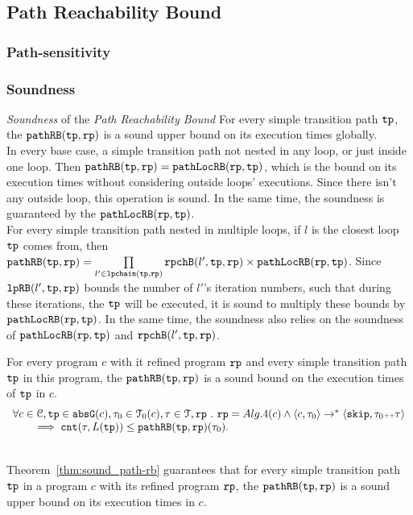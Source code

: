 \subsection{Path Reachability Bound}
\subsubsection{Path-sensitivity}
\subsubsection{Soundness}


\emph{Soundness} of the \emph{Path Reachability Bound}  
For every simple transition path $\mathtt{tp}$, the $\mathtt{pathRB}(\mathtt{tp}, \mathtt{rp})$
is a sound upper bound on its execution times globally.
\\
In every base case, a simple transition path not nested in any loop, or just inside one loop.
Then $\mathtt{pathRB}(\mathtt{tp}, \mathtt{rp}) = \mathtt{pathLocRB}(\mathtt{rp}, \mathtt{tp})$, which is the bound on its execution times without considering
outside loops' executions. Since there isn't any outside loop, this operation is sound.
In the same time, the soundness is guaranteed by the $\mathtt{pathLocRB}(\mathtt{rp}, \mathtt{tp})$.
\\
For every simple transition path nested in multiple loops, if $l$ is the closest loop $\mathtt{tp}$ comes from, then
$\mathtt{pathRB}(\mathtt{tp}, \mathtt{rp}) =
\prod\limits_{l' \in \mathtt{lpchain}(\mathtt{tp}, \mathtt{rp})} \mathtt{rpchB}(l', \mathtt{tp}, \mathtt{rp}) \times \mathtt{pathLocRB}(\mathtt{rp}, \mathtt{tp})$.
Since $\mathtt{lpRB}(l', \mathtt{tp}, \mathtt{rp})$ bounds the number of $l'$'s iteration numbers,
such that during these iterations, the $\mathtt{tp}$ will be executed,
it is sound to multiply these bounds by $\mathtt{pathLocRB}(\mathtt{rp}, \mathtt{tp})$.
In the same time, the soundness also relies on the soundness of $\mathtt{pathLocRB}(\mathtt{rp}, \mathtt{tp})$ and $\mathtt{rpchB}(l', \mathtt{tp}, \mathtt{rp})$. 
%
\begin{thm}
  \label{thm:sound_path-rb}
  For every program $c$ with it refined program $\mathtt{rp}$ and 
  every simple transition path $\mathtt{tp}$ in this program,
   the $\mathtt{pathRB}(\mathtt{tp}, \mathtt{rp})$
is a sound bound on the execution times of $\mathtt{tp}$ in $c$.
  \[
    \begin{array}{l}
    \forall c \in \mathcal{C}, \mathtt{tp} \in \mathtt{abs}{\mathtt{G}}(c), \mathtt{\tau}_0 \in \mathcal{T}_0(c), \mathtt{\tau} \in \mathcal{T}, \mathtt{rp} ~.~ 
    \mathtt{rp} = Alg.4(c)
    \land
    \langle c, \mathtt{\tau}_0 \rangle \to^* 
    \langle {\ensuremath{\mathtt{skip}}, \ensuremath{\mathtt{\tau}}_0 {\scriptscriptstyle ++}\ensuremath{\mathtt{\tau}}} \rangle
    \\ \qquad
    \implies
    \mathtt{cnt}(\mathtt{\tau}, L(\mathtt{tp})) \leq \mathtt{pathRB}(\mathtt{tp}, \mathtt{rp})(\mathtt{\tau}_0).
    \end{array}
    \]
\end{thm}
\\
Theorem~\ref{thm:sound_path-rb} guarantees that
for every simple transition path $\mathtt{tp}$ in a program $c$ with its refined program $\mathtt{rp}$,
the $\mathtt{pathRB}(\mathtt{tp}, \mathtt{rp})$
is a sound upper bound on its execution times in $c$.
